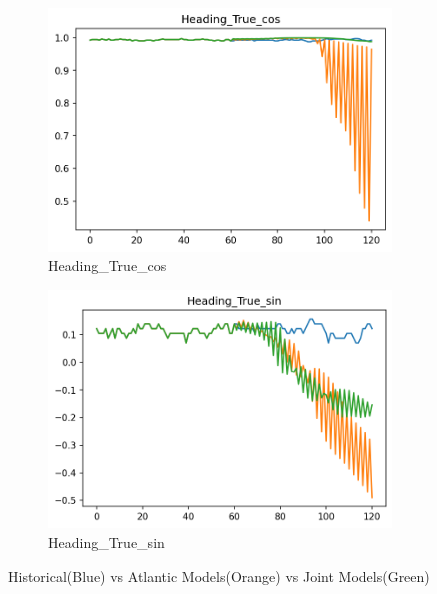 \begin{figure}[ht]
\begin{subfigure}[b]{0.32\textwidth}
         \includegraphics[width=\textwidth]{figures/prediction-plots-joint/Heading_True_cos.png}
         \caption{Heading\_True\_cos}
     \end{subfigure}
     \begin{subfigure}[b]{0.32\textwidth}
         \centering
         \includegraphics[width=\textwidth]{figures/prediction-plots-joint/Heading_True_sin.png}
         \caption{Heading\_True\_sin}
     \end{subfigure}
        \caption{Historical(Blue) vs Atlantic Models(Orange) vs Joint Models(Green)}
        \label{fig:prediction-full-1-joint}
\end{figure}


